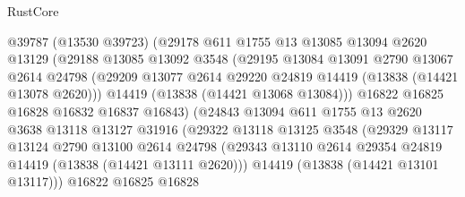 \begin{lexlean}{RustCore}
\begin{coremodule}
                        @39787
                        (@13530 @39723)
                        (@29178
                          @611
                          @1755
                          @13
                          @13085
                          @13094
                          @2620
                          @13129
                          (@29188
                            @13085
                            @13092
                            @3548
                            (@29195
                              @13084
                              @13091
                              @2790
                              @13067
                              @2614
                              @24798
                              (@29209
                                @13077
                                @2614
                                @29220
                                @24819
                                @14419
                                (@13838 (@14421 @13078 @2620)))
                              @14419
                              (@13838 (@14421 @13068 @13084)))
                            @16822
                            @16825
                            @16828
                            @16832
                            @16837
                            @16843)
                          (@24843
                            @13094
                            @611
                            @1755
                            @13
                            @2620
                            @3638
                            @13118
                            @13127
                            @31916
                            (@29322
                              @13118
                              @13125
                              @3548
                              (@29329
                                @13117
                                @13124
                                @2790
                                @13100
                                @2614
                                @24798
                                (@29343
                                  @13110
                                  @2614
                                  @29354
                                  @24819
                                  @14419
                                  (@13838 (@14421 @13111 @2620)))
                                @14419
                                (@13838 (@14421 @13101 @13117)))
                              @16822
                              @16825
                              @16828

\end{coremodule}
\end{lexlean}
